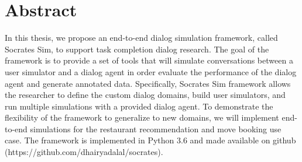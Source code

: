 \chapter*{Abstract}
\thispagestyle{empty}	%

In this thesis, we propose an end-to-end dialog simulation framework, called Socrates Sim, to support task completion dialog research. The goal of the framework is to provide a set of tools that will simulate conversations between a user simulator and a dialog agent in order evaluate the performance of the dialog agent and generate annotated data. Specifically, Socrates Sim framework allows the researcher to define the custom dialog domains, build user simulators, and run multiple simulations with a provided dialog agent. To demonstrate the flexibility of the framework to generalize to new domains, we will implement end-to-end simulations for the restaurant recommendation and move booking use case. The framework is implemented in Python 3.6 and made available on github (https://github.com/dhairyadalal/socrates). 

